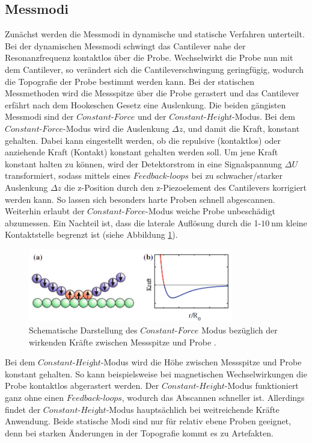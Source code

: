 \subsection{Messmodi}
\label{sec:Messmodi}
Zunächst werden die Messmodi in dynamische und statische Verfahren unterteilt.
Bei der dynamischen Messmodi schwingt das Cantilever nahe der Resonanzfrequenz
kontaktlos über die Probe. Wechselwirkt die Probe nun mit dem Cantilever, so verändert
sich die Cantileverschwingung geringfügig, wodurch die Topografie der Probe bestimmt
werden kann.
Bei der statischen Messmethoden wird die Messspitze über die Probe gerastert und
das Cantilever erfährt nach dem Hookeschen Gesetz eine Auslenkung. Die beiden
gängisten Messmodi sind der $\textit{Constant-Force}$ und der
$\textit{Constant-Height}$-Modus. Bei dem $\textit{Constant-Force}$-Modus wird
die Auslenkung $\Delta z$, und damit die Kraft, konstant gehalten. Dabei kann
eingestellt werden, ob die repulsive (kontaktlos) oder anziehende Kraft (Kontakt)
konstant gehalten werden soll. Um jene Kraft konstant halten zu können, wird der
Detektorstrom in eine Signalspannung $\Delta U$ transformiert, sodass mittels
eines $\textit{Feedback-loops}$ bei zu schwacher/starker Auslenkung $\Delta z$
die z-Position durch den z-Piezoelement des Cantilevers korrigiert werden kann.
So lassen sich besonders harte Proben schnell abgescannen. Weiterhin erlaubt der
$\textit{Constant-Force}$-Modus weiche Probe unbeschädigt abzumessen. Ein Nachteil
ist, dass die laterale Auflösung durch die 1-$\SI{10}{\nano\meter}$ kleine
Kontaktstelle begrenzt ist (siehe Abbildung \ref{fig:const-force}).

\begin{figure}[H]
	\centering
	\includegraphics[width=0.8\textwidth]{Abb/const-force.png}
	\caption{Schematische Darstellung des $\textit{Constant-Force}$ Modus bezüglich
	der wirkenden Kräfte zwischen Messspitze und Probe \cite[179]{AFM}.}
	\label{fig:const-force}
\end{figure}

\noindent
Bei dem
$\textit{Constant-Height}$-Modus wird die Höhe zwischen Messspitze und Probe
konstant gehalten. So kann beispielsweise bei magnetischen Wechselwirkungen die
Probe kontaktlos abgerastert werden. Der $\textit{Constant-Height}$-Modus funktioniert
ganz ohne einen $\textit{Feedback-loops}$, wodurch das Abscannen schneller ist.
Allerdings findet der $\textit{Constant-Height}$-Modus hauptsächlich bei weitreichende
Kräfte Anwendung. Beide statische Modi sind nur für relativ ebene Proben geeignet,
denn bei starken Änderungen in der Topografie kommt es zu Artefakten.


